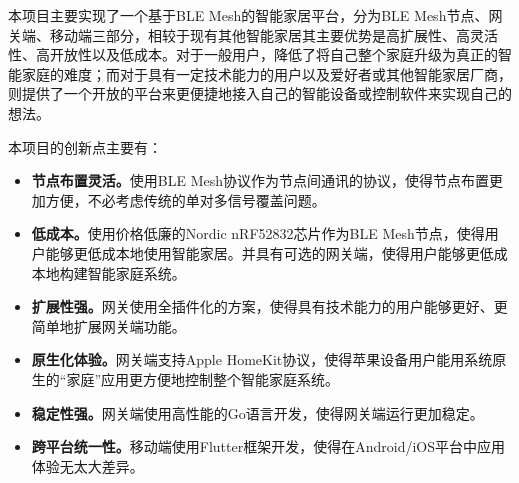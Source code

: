 \begin{cabstract}
  本项目主要实现了一个基于BLE Mesh的智能家居平台，分为BLE Mesh节点、网关端、移动端三部分，相较于现有其他智能家居其主要优势是高扩展性、高灵活性、高开放性以及低成本。对于一般用户，降低了将自己整个家庭升级为真正的智能家庭的难度；而对于具有一定技术能力的用户以及爱好者或其他智能家居厂商，则提供了一个开放的平台来更便捷地接入自己的智能设备或控制软件来实现自己的想法。

  本项目的创新点主要有：
  \begin{itemize}
    \item \textbf{节点布置灵活。}使用BLE Mesh协议作为节点间通讯的协议，使得节点布置更加方便，不必考虑传统的单对多信号覆盖问题。
    \item \textbf{低成本。}使用价格低廉的Nordic nRF52832芯片作为BLE Mesh节点，使得用户能够更低成本地使用智能家居。并具有可选的网关端，使得用户能够更低成本地构建智能家庭系统。
    \item \textbf{扩展性强。}网关使用全插件化的方案，使得具有技术能力的用户能够更好、更简单地扩展网关端功能。
    \item \textbf{原生化体验。}网关端支持Apple HomeKit协议，使得苹果设备用户能用系统原生的“家庭”应用更方便地控制整个智能家庭系统。
    \item \textbf{稳定性强。}网关端使用高性能的Go语言开发，使得网关端运行更加稳定。
    \item \textbf{跨平台统一性。}移动端使用Flutter框架开发，使得在Android/iOS平台中应用体验无太大差异。
  \end{itemize}
\end{cabstract}






